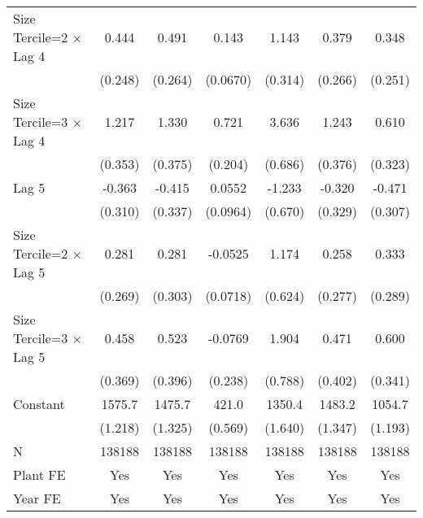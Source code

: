 \begin{table}[htbp]
\begin{tabular}{l*{6}{c}}
\addlinespace
Size Tercile=2 $\times$ Lag 4&    0.444         &    0.491         &    0.143\sym{*}  &    1.143\sym{***}&    0.379         &    0.348         \\
                &  (0.248)         &  (0.264)         & (0.0670)         &  (0.314)         &  (0.266)         &  (0.251)         \\
\addlinespace
Size Tercile=3 $\times$ Lag 4&    1.217\sym{***}&    1.330\sym{***}&    0.721\sym{***}&    3.636\sym{***}&    1.243\sym{***}&    0.610         \\
                &  (0.353)         &  (0.375)         &  (0.204)         &  (0.686)         &  (0.376)         &  (0.323)         \\
\addlinespace
Lag 5           &   -0.363         &   -0.415         &   0.0552         &   -1.233         &   -0.320         &   -0.471         \\
                &  (0.310)         &  (0.337)         & (0.0964)         &  (0.670)         &  (0.329)         &  (0.307)         \\
\addlinespace
Size Tercile=2 $\times$ Lag 5&    0.281         &    0.281         &  -0.0525         &    1.174         &    0.258         &    0.333         \\
                &  (0.269)         &  (0.303)         & (0.0718)         &  (0.624)         &  (0.277)         &  (0.289)         \\
\addlinespace
Size Tercile=3 $\times$ Lag 5&    0.458         &    0.523         &  -0.0769         &    1.904\sym{*}  &    0.471         &    0.600         \\
                &  (0.369)         &  (0.396)         &  (0.238)         &  (0.788)         &  (0.402)         &  (0.341)         \\
\addlinespace
Constant        &   1575.7\sym{***}&   1475.7\sym{***}&    421.0\sym{***}&   1350.4\sym{***}&   1483.2\sym{***}&   1054.7\sym{***}\\
                &  (1.218)         &  (1.325)         &  (0.569)         &  (1.640)         &  (1.347)         &  (1.193)         \\
\midrule
N               &   138188         &   138188         &   138188         &   138188         &   138188         &   138188         \\
Plant FE        &      Yes         &      Yes         &      Yes         &      Yes         &      Yes         &      Yes         \\
Year FE         &      Yes         &      Yes         &      Yes         &      Yes         &      Yes         &      Yes         \\

\end{tabular}
\end{table}
